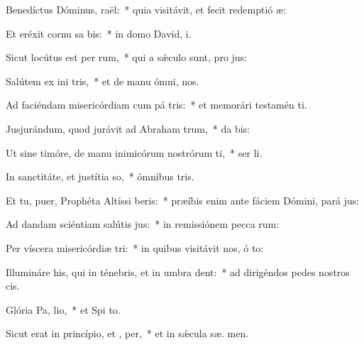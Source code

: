 \item Benedíctus Dóminus,  raël:~* quia visitávit, et fecit redemptió  æ:
\item Et eréxit cornu sa bis:~* in domo David,  i.
\item Sicut locútus est per  rum,~* qui a sǽculo sunt, pro jus:
\item Salútem ex ini tris,~* et de manu ómni,   nos.
\item Ad faciéndam misericórdiam cum pá tris:~* et memorári testamén  ti.
\item Jusjurándum, quod jurávit ad Abraham  trum,~* da  bis:
\item Ut sine timóre, de manu inimicórum nostrórum ti,~* ser li.
\item In sanctitáte, et justítia  so,~* ómnibus  tris.
\item Et tu, puer, Prophéta Altíssi beris:~* præíbis enim ante fáciem Dómini, pará  jus:
\item Ad dandam sciéntiam salútis  jus:~* in remissiónem pecca rum:
\item Per víscera misericórdiæ  tri:~* in quibus visitávit nos, ó  to:
\item Illumináre his, qui in ténebris, et in umbra  dent:~* ad dirigéndos pedes nostros   cis.
\item Glória Pa,  lio,~* et Spi to.
\item Sicut erat in princípio, et ,  per,~* et in sǽcula sæ. men.
